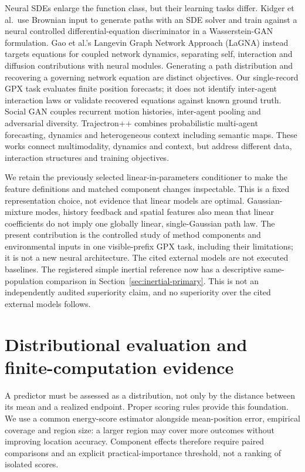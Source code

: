 Neural SDEs enlarge the function class, but their learning tasks differ.
Kidger et al.\ use Brownian input to generate paths with an SDE solver and
train against a neural controlled differential-equation discriminator in
a Wasserstein-GAN formulation\cite{kidger2021}. Gao et al.'s Langevin Graph
Network Approach (LaGNA) instead targets equations for coupled network
dynamics, separating self, interaction and diffusion contributions with
neural modules\cite{gao2024}. Generating a path distribution and recovering
a governing network equation are distinct objectives. Our single-record
GPX task evaluates finite position forecasts; it does not identify
inter-agent interaction laws or validate recovered equations against known
ground truth. Social GAN couples recurrent motion histories,
inter-agent pooling and adversarial diversity\cite{gupta2018}.
Trajectron++ combines probabilistic multi-agent forecasting, dynamics and
heterogeneous context including semantic maps\cite{salzmann2020}.
These works connect multimodality, dynamics and context, but address
different data, interaction structures and training objectives.

We retain the previously selected linear-in-parameters conditioner to make
the feature definitions and matched component changes inspectable.
This is a fixed representation choice, not evidence that linear models
are optimal. Gaussian-mixture modes, history feedback and spatial features
also mean that linear coefficients do not imply one globally linear,
single-Gaussian path law. The present contribution is the controlled study
of method components and environmental inputs in one visible-prefix GPX
task, including their limitations; it is not a new neural architecture.
The cited external models are not executed baselines. The registered simple
inertial reference now has a descriptive same-population comparison in
Section~\ref{sec:inertial-primary}. This is not an independently audited
superiority claim, and no superiority over the cited external models follows.


\section{Distributional evaluation and finite-computation evidence}
A predictor must be assessed as a distribution, not only by the distance
between its mean and a realized endpoint. Proper scoring rules provide
this foundation\cite{gneiting2007,gneiting2008}. We use a common energy-score
estimator alongside mean-position error, empirical coverage and region
size: a larger region may cover more outcomes without improving location
accuracy. Component effects therefore require paired comparisons and an
explicit practical-importance threshold, not a ranking of isolated scores.

